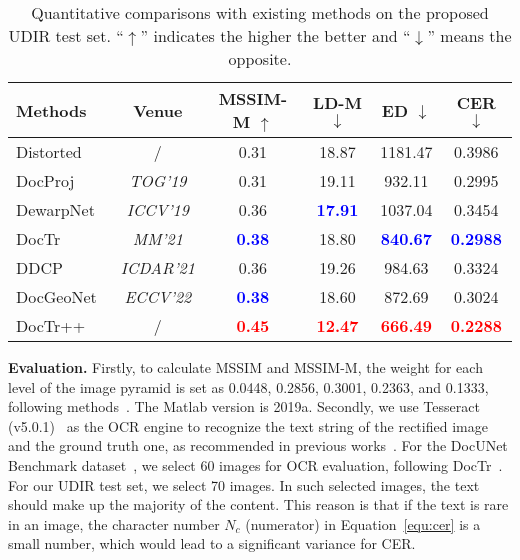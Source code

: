 \documentclass[lettersize,journal]{IEEEtran}
\begin{document}
\setlength{\tabcolsep}{1.15mm}
\begin{table}[t]
\centering
	\caption{Quantitative comparisons with existing methods on the proposed UDIR test set. ``$\uparrow$'' indicates the higher the better and ``$\downarrow$'' means the opposite.}
\begin{tabular}{l|c|cccc} 
   \toprule
   \textbf{Methods} & \textbf{Venue} &\textbf{MSSIM-M} $\uparrow$ &\textbf{LD-M} $\downarrow$  &\textbf{ED} $\downarrow$ &\textbf{CER} $\downarrow$   \\ 
   \midrule
    Distorted & / & 0.31 & 18.87 & 1181.47 & 0.3986 \\
            \midrule
 
    DocProj~\cite{li2019document} & \emph{TOG'19} &   0.31 & 19.11 & 932.11  &   0.2995 \\

    DewarpNet~\cite{9010747} & \emph{ICCV'19}  &   0.36 & \textcolor{blue}{\textbf{17.91}}  & 1037.04  &  0.3454   \\

    DocTr~\cite{feng2021doctr} & \emph{MM'21} &  \textcolor{blue}{\textbf{0.38}}  & 18.80 & \textcolor{blue}{\textbf{840.67}}    &   \textcolor{blue}{\textbf{0.2988}}  \\  
    
    DDCP~\cite{xie2021document}  & \emph{ICDAR'21} &  0.36 & 19.26 & 984.63  &  0.3324  \\  

    DocGeoNet~\cite{feng2022geometric} & \emph{ECCV'22} &  \textcolor{blue}{\textbf{0.38}} & 18.60 & 872.69  &  0.3024     \\ 

    \midrule
    DocTr++ & / &   \textcolor{red}{\textbf{0.45}}   &   \textcolor{red}{\textbf{12.47}}  
    &  \textcolor{red}{\textbf{666.49}}    &  \textcolor{red}{\textbf{0.2288}}      \\
   \bottomrule
\end{tabular}
\label{tab:t2}
\end{table} 

\smallskip
\textbf{Evaluation.}
Firstly, to calculate MSSIM and MSSIM-M, the weight for each level of the image pyramid is set as 0.0448, 0.2856, 0.3001, 0.2363, and 0.1333, following methods~\cite{feng2021doctr,feng2021docscanner,feng2022geometric}.
The Matlab version is 2019a.
Secondly,
we use Tesseract (v5.0.1)~\cite{4376991} as the OCR engine to recognize the text string of the rectified image and the ground truth one, as recommended in previous works~\cite{feng2021doctr,feng2021docscanner,feng2022geometric}.
For the DocUNet Benchmark dataset~\cite{8578592}, we select 60 images for OCR evaluation, following DocTr~\cite{feng2021doctr}.
For our UDIR test set, we select 70 images.
In such selected images, the text should make up the majority of the content. This reason is that if the text is rare in an image, the character number ${N_c}$ (numerator) in Equation~\eqref{equ:cer} is a small number, which would lead to a significant variance for CER.
\end{document}
